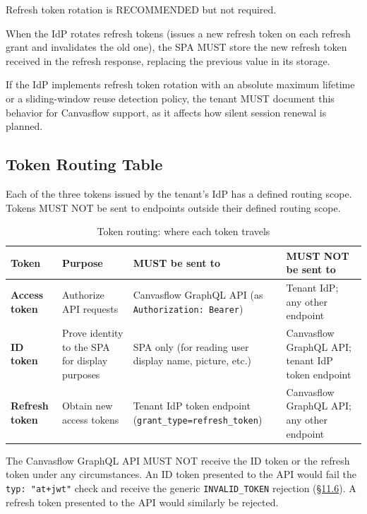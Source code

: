 Refresh token rotation is RECOMMENDED but not required.

When the IdP rotates refresh tokens (issues a new refresh token on each refresh grant
and invalidates the old one), the SPA MUST store the new refresh token received in the
refresh response, replacing the previous value in its storage.

If the IdP implements refresh token rotation with an absolute maximum lifetime or a
sliding-window reuse detection policy, the tenant MUST document this behavior for
Canvasflow support, as it affects how silent session renewal is planned.

\subsection{Token Routing Table}

Each of the three tokens issued by the tenant's IdP has a defined routing scope. Tokens
MUST NOT be sent to endpoints outside their defined routing scope.

\begin{table}[htbp]
\centering
\begin{tabularx}{\textwidth}{@{}lXXX@{}}
\toprule
\textbf{Token} & \textbf{Purpose} & \textbf{MUST be sent to} & \textbf{MUST NOT be sent to} \\
\midrule
\textbf{Access token} &
  Authorize API requests &
  Canvasflow GraphQL API (as \texttt{Authorization: Bearer}) &
  Tenant IdP; any other endpoint \\[6pt]
\textbf{ID token} &
  Prove identity to the SPA for display purposes &
  SPA only (for reading user display name, picture, etc.) &
  Canvasflow GraphQL API; tenant IdP token endpoint \\[6pt]
\textbf{Refresh token} &
  Obtain new access tokens &
  Tenant IdP token endpoint (\scriptsize \texttt{grant\_type=refresh\_token}) &
  Canvasflow GraphQL API; any other endpoint \\
\bottomrule
\end{tabularx}
\caption{Token routing: where each token travels}
\end{table}

The Canvasflow GraphQL API MUST NOT receive the ID token or the refresh token under any
circumstances. An ID token presented to the API would fail the \texttt{typ: "at+jwt"}
check and receive the generic \texttt{INVALID\_TOKEN} rejection (\hyperref[sec:generic-error-responses]{\S11.6}). A refresh token presented to the API would similarly be rejected.

